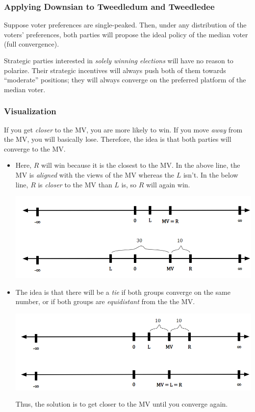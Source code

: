 \documentclass[letterpaper]{article}
\begin{document}
\subsubsection{Applying Downsian to Tweedledum and Tweedledee}
Suppose voter preferences are single-peaked. Then, under any distribution of the voters' preferences, both parties will propose the ideal policy of the median voter (full convergence).

\bigskip 

Strategic parties interested in \emph{solely winning elections} will have no reason to polarize. Their strategic incentives will always push both of them towards ``moderate'' positions; they will always converge on the preferred platform of the median voter. 

\subsubsection{Visualization}
If you get \emph{closer} to the MV, you are more likely to win. If you move \emph{away} from the MV, you will basically lose. Therefore, the idea is that both parties will converge to the MV. 
\begin{itemize}
    \item Here, $R$ will win because it is the closest to the MV. In the above line, the MV is \emph{aligned} with the views of the MV whereas the $L$ isn't. In the below line, $R$ is \emph{closer} to the MV than $L$ is, so $R$ will again win. 
    \begin{center}
        \includegraphics[scale=0.6]{assets/downsian_2.png}
    \end{center}

    \item The idea is that there will be a \emph{tie} if both groups converge on the same number, or if both groups are \emph{equidistant} from the the MV. 
    \begin{center}
        \includegraphics[scale=0.6]{assets/downsian_1.png}
    \end{center}
    Thus, the solution is to get closer to the MV until you converge again. 
\end{itemize}
\end{document}
